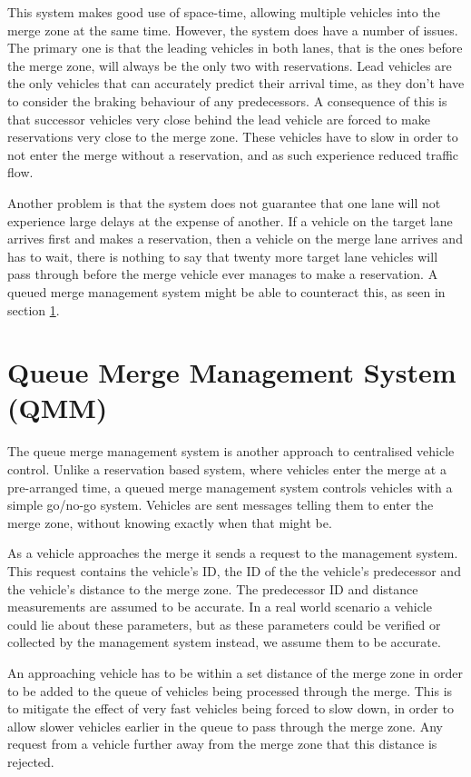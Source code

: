 This system makes good use of space-time, allowing multiple vehicles into the merge zone at the same time. However, the system does have a number of issues. The primary one is that the leading vehicles in both lanes, that is the ones before the merge zone, will always be the only two with reservations. Lead vehicles are the only vehicles that can accurately predict their arrival time, as they don't have to consider the braking behaviour of any predecessors. A consequence of this is that successor vehicles very close behind the lead vehicle are forced to make reservations very close to the merge zone. These vehicles have to slow in order to not enter the merge without a reservation, and as such experience reduced traffic flow.

Another problem is that the system does not guarantee that one lane will not experience large delays at the expense of another. If a vehicle on the target lane arrives first and makes a reservation, then a vehicle on the merge lane arrives and has to wait, there is nothing to say that twenty more target lane vehicles will pass through before the merge vehicle ever manages to make a reservation. A queued merge management system might be able to counteract this, as seen in section \ref{sec:Queue Merge Management System}.

\section{Queue Merge Management System (QMM)}
\label{sec:Queue Merge Management System}
The queue merge management system is another approach to centralised vehicle control. Unlike a reservation based system, where vehicles enter the merge at a pre-arranged time, a queued merge management system controls vehicles with a simple go/no-go system. Vehicles are sent messages telling them to enter the merge zone, without knowing exactly when that might be.

As a vehicle approaches the merge it sends a request to the management system. This request contains the vehicle's ID, the ID of the the vehicle's predecessor and the vehicle's distance to the merge zone. The predecessor ID and distance measurements are assumed to be accurate. In a real world scenario a vehicle could lie about these parameters, but as these parameters could be verified or collected by the management system instead, we assume them to be accurate.

An approaching vehicle has to be within a set distance of the merge zone in order to be added to the queue of vehicles being processed through the merge. This is to mitigate the effect of very fast vehicles being forced to slow down, in order to allow slower vehicles earlier in the queue to pass through the merge zone. Any request from a vehicle further away from the merge zone that this distance is rejected.

